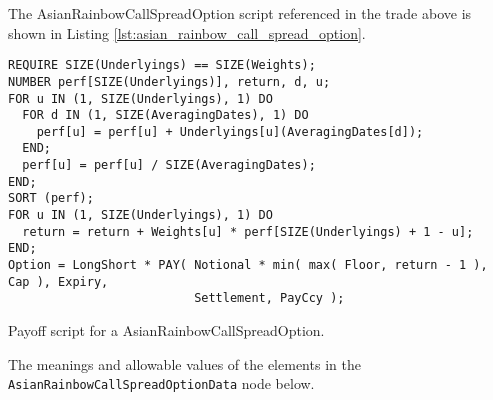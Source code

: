 The AsianRainbowCallSpreadOption script referenced in the trade above is shown in Listing
\ref{lst:asian_rainbow_call_spread_option}.

\begin{listing}[hbt]
\begin{verbatim}
REQUIRE SIZE(Underlyings) == SIZE(Weights);
NUMBER perf[SIZE(Underlyings)], return, d, u;
FOR u IN (1, SIZE(Underlyings), 1) DO
  FOR d IN (1, SIZE(AveragingDates), 1) DO
    perf[u] = perf[u] + Underlyings[u](AveragingDates[d]);
  END;
  perf[u] = perf[u] / SIZE(AveragingDates);
END;
SORT (perf);
FOR u IN (1, SIZE(Underlyings), 1) DO
  return = return + Weights[u] * perf[SIZE(Underlyings) + 1 - u];
END;
Option = LongShort * PAY( Notional * min( max( Floor, return - 1 ), Cap ), Expiry,
                          Settlement, PayCcy );
\end{verbatim}
\caption{Payoff script for a AsianRainbowCallSpreadOption.}
\label{lst:asian_rainbow_call_spread_option}
\end{listing}

The meanings and allowable values of the elements in the \lstinline!AsianRainbowCallSpreadOptionData! node below.

